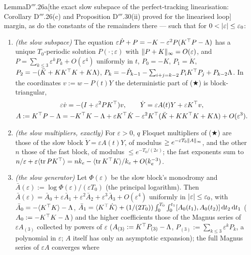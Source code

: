 \begin{thm}{Lemma}{D$'''$.26a}[the exact slow subspace of the perfect-tracking linearisation: Corollary D$'''$.26(c)
and Proposition D$'''$.30(ii) proved for the linearised loop]
margin, as do the constants of the remainders there --- such that for $0 < \lvert \varepsilon\rvert\le\varepsilon_0$:
\begin{enumerate}[label=\textup{(\roman*)}]
  \item \emph{(the slow subspace)} The equation $\varepsilon\dot P + P = -K - \varepsilon^2P(K^\top P - \Lambda)$ has a
    unique $T_0$-periodic solution $P(\cdot\,;\varepsilon)$ with $\lVert P + K\rVert_\infty = O(\varepsilon)$, and
    $P = \sum_{k\le3}\varepsilon^kP_k + O(\varepsilon^4)$ uniformly in $t$, $P_0 = -K$, $P_1 = \dot K$,
    $P_2 = -(\ddot K + KK^\top K + K\Lambda)$,
    $P_k = -\dot P_{k-1} - \sum_{i+j=k-2}P_iK^\top P_j + P_{k-2}\Lambda$. In the coordinates $v := w - P(t)Y$ the
    deterministic part of \textup{($\bigstar$)} is block-triangular,
    \begin{gather*}
      \varepsilon\dot v = -(I + \varepsilon^2PK^\top)v,\qquad\dot Y = \varepsilon A(t)Y + \varepsilon K^\top v,\\
      A := K^\top P - \Lambda = -K^\top K - \Lambda + \varepsilon K^\top\dot K
      - \varepsilon^2K^\top(\ddot K + KK^\top K + K\Lambda) + O(\varepsilon^3).
    \end{gather*}
  \item \emph{(the slow multipliers, exactly)} For $\varepsilon > 0$, $q$ Floquet multipliers of
    \textup{($\bigstar$)} are those of the slow block $\dot Y = \varepsilon A(t)Y$, of modulus
    $\ge e^{-\varepsilon T_0\lVert A\rVert_\infty}$, and the other $n$ those of the fast block, of modulus
    $\le e^{-T_0/(2\varepsilon)}$; the fast exponents sum to
    $n/\varepsilon + \varepsilon\langle\operatorname{tr} PK^\top\rangle = nk_e - \langle\operatorname{tr} K^\top K\rangle/k_e + O(k_e^{-3})$.
  \item \emph{(the slow generator)} Let $\Phi(\varepsilon)$ be the slow block's monodromy and
    $\bar A(\varepsilon) := \log\Phi(\varepsilon)/(\varepsilon T_0)$ (the principal logarithm). Then
    $\bar A(\varepsilon) = \bar A_0 + \varepsilon\bar A_1 + \varepsilon^2\bar A_2 + \varepsilon^3\bar A_3
    + O(\varepsilon^4)$ uniformly in $\lvert \varepsilon\rvert\le\varepsilon_0$, with
    $\bar A_0 = -\langle K^\top K\rangle - \Lambda$,
    $\bar A_1 = \langle K^\top\dot K\rangle
    + (1/(2T_0))\int_0^{T_0}\int_0^{t_1}[A_0(t_1),A_0(t_2)]\,\mathrm{d} t_2\,\mathrm{d} t_1$ ($A_0 := -K^\top K - \Lambda$) and the
    higher coefficients those of the Magnus series of $\varepsilon A_{(3)}$ collected by powers of $\varepsilon$
    ($A_{(3)} := K^\top P_{(3)} - \Lambda$, $P_{(3)} := \sum_{k\le3}\varepsilon^kP_k$, a polynomial in $\varepsilon$;
    $A$ itself has only an asymptotic expansion); the full Magnus series of $\varepsilon A$ converges where

\end{enumerate}
\end{thm}
